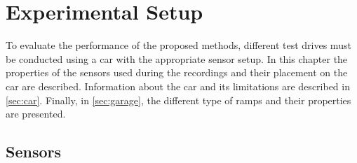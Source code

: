 \chapter{Experimental Setup}
\label{ch:ExperimentalSetup}

To evaluate the performance of the proposed methods, different test drives must be conducted using a car with the appropriate sensor setup.
In this chapter the properties of the sensors used during the recordings and their placement on the car are described.
Information about the car and its limitations are described in \cref{sec:car}.
Finally, in \cref{sec:garage}, the different type of ramps and their properties are presented.



\section{Sensors}
